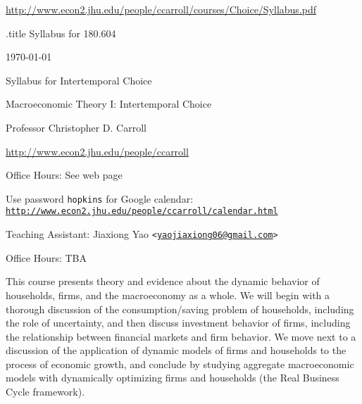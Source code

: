 \documentclass{\econtex}
\begin{document}

\begin{center}{{\tiny \url{http://www.econ2.jhu.edu/people/ccarroll/courses/Choice/Syllabus.pdf}}}\end{center}


\begin{verbatimwrite}{\jobname.title}
Syllabus for 180.604
\end{verbatimwrite}

\thispagestyle{empty}

\newenvironment{blockpar}{\par\begin{minipage}{\textwidth}
\setlength{\parskip}{.5\baselineskip plus 1pt minus 1pt}}{\end{minipage}}

\pagestyle{plain}
\thispagestyle{empty}

\begin{center}
{\tiny \href{http://www.econ2.jhu.edu/people/ccarroll/courses/Choice/Syllabus.pdf}{\jobname} \hfill \today}

{\LARGE Syllabus for Intertemporal Choice}
\medskip\medskip

{\LARGE Macroeconomic Theory I: Intertemporal Choice}
\medskip\medskip
\medskip\medskip

\smallskip


Professor Christopher D. Carroll

\medskip

\url{http://www.econ2.jhu.edu/people/ccarroll}

Office Hours: See web page

Use password \texttt{hopkins} for Google calendar: \texttt{\href{http://www.econ2.jhu.edu/people/ccarroll/calendar.html}{http://www.econ2.jhu.edu/people/ccarroll/calendar.html}}

\medskip\medskip\medskip
Teaching Assistant: Jiaxiong Yao \texttt{<\href{mailto:yaojiaxiong06@gmail.com}{\texttt{yaojiaxiong06@gmail.com}}>}

Office Hours: TBA %

\medskip\medskip\medskip

\medskip\medskip

\end{center}

This course presents theory and evidence about the dynamic behavior of
households, firms, and the macroeconomy as a whole.  We will begin
with a thorough discussion of the consumption/saving problem of
households, including the role of uncertainty, and then discuss
investment behavior of firms, including the relationship between
financial markets and firm behavior.  We move next to a discussion of
the application of dynamic models of firms and households to the
process of economic growth, and conclude by studying aggregate
macroeconomic models with dynamically optimizing firms and households
(the Real Business Cycle framework).
\end{document}
